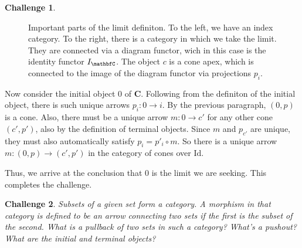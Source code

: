 \documentclass{article}
\newcommand {\cat}{%
\mathbf%
}
\theoremstyle{definition}
\newtheorem{ch}{Challenge}
\begin{document}
\begin{ch}
\begin{figure}[h]
	\caption{Important parts of the limit definiton. To the left, we have an index category. To the right, there is a category in which we take the limit. They are connected via a diagram functor, wich in this case is the identity functor $I_{\cat C}$. The object $c$ is a cone apex, which is connected to the image of the diagram functor via projections $p_i$. \label{fig:limit_of_id}}
\end{figure}

Now consider the initial object $0$ of $\cat C$. Following from the definiton of the initial object, there is such unique arrows $p_i: 0 \to i$. By the previous paragraph, $(0,p)$ is a cone. Also, there must be a unique arrow $m: 0 \to c'$ for any other cone $(c',p')$, also by the definition of terminal objects. Since $m$ and $p_{c'}$ are unique, they must also automatically satisfy $p_i = p'_i \circ m$. So there is a unique arrow $m: (0,p) \to (c',p')$ in the category of cones over $\mathrm{Id}$. 

Thus, we arrive at the conclusion that $0$ is the limit we are seeking. This completes the challenge.
\end{ch}






















\begin{ch}\textit{Subsets of a given set form a category. A morphism in that category is defined to be an arrow connecting two sets if the first is the subset of the second. What is a pullback of two sets in such a category? What’s a pushout? What are the initial and terminal objects?}\end{ch}
\end{document}
